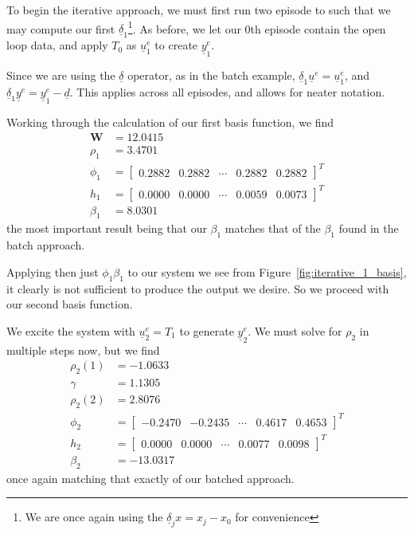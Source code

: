 To begin the iterative approach, we must first run two episode to such that we may compute our first $\underline{\delta}_1$\footnote{We are once again using the $\underline{\delta}_j x = x_j - x_0$ for convenience}. As before, we let our 0th episode contain the open loop data, and apply $T_0$ as $\underline{u}^e_1$ to create $\underline{y}^e_1$.

Since we are using the $\underline{\delta}$ operator, as in the batch example, $\underline{\delta}_1 \underline{u}^e = \underline{u}_1^e$, and $\underline{\delta}_1 \underline{y}^e = \underline{y}_1^e - \underline{d}$. This applies across all episodes, and allows for neater notation. 

Working through the calculation of our first basis function, we find
\begin{equation}
    \begin{split}
        \textbf{W} &= 12.0415 \\
        \rho_1 &= 3.4701    \\
        \phi_1 &= \begin{bmatrix}
            0.2882 & 0.2882 & \cdots & 0.2882 & 0.2882
        \end{bmatrix}^T   \\
        h_1 &= \begin{bmatrix}
            0.0000 & 0.0000 & \cdots & 0.0059 & 0.0073
        \end{bmatrix}^T   \\
        \beta_1 &= 8.0301
    \end{split}
\end{equation}
the most important result being that our $\beta_1$ matches that of the $\beta_1$ found in the batch approach.

Applying then just $\phi_1 \beta_1$ to our system we see from Figure~\ref{fig:iterative_1_basis}, it clearly is not sufficient to produce the output we desire. So we proceed with our second basis function.

We excite the system with $\underline{u}^e_2 = T_1$ to generate $\underline{y}^e_2$. We must solve for $\rho_2$ in multiple steps now, but we find
\begin{equation}
    \begin{split}
        \rho_2(1) &= -1.0633 \\
        \gamma &= 1.1305    \\
        \rho_2(2) &= 2.8076 \\
        \phi_2 &= \begin{bmatrix}
            -0.2470 & -0.2435 & \cdots & 0.4617 & 0.4653
        \end{bmatrix}^T \\
        h_2 &= \begin{bmatrix}
            0.0000 & 0.0000 & \cdots & 0.0077 & 0.0098
        \end{bmatrix}^T   \\
        \beta_2 &= -13.0317
    \end{split}
\end{equation}
once again matching that exactly of our batched approach.

